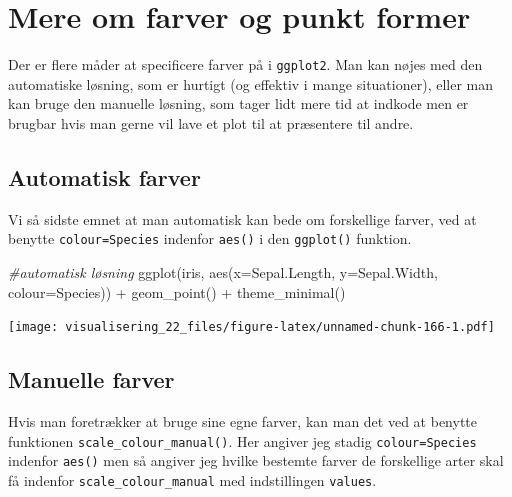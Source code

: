 \documentclass[
]{book}
\newenvironment{Shaded}{\begin{snugshade}}{\end{snugshade}}
\newcommand{\AttributeTok}[1]{\textcolor[rgb]{0.77,0.63,0.00}{#1}}
\newcommand{\CommentTok}[1]{\textcolor[rgb]{0.56,0.35,0.01}{\textit{#1}}}
\newcommand{\FunctionTok}[1]{\textcolor[rgb]{0.00,0.00,0.00}{#1}}
\newcommand{\NormalTok}[1]{#1}
\newcommand{\SpecialCharTok}[1]{\textcolor[rgb]{0.00,0.00,0.00}{#1}}
\begin{document}
\hypertarget{mere-om-farver-og-punkt-former}{%
\section{Mere om farver og punkt former}\label{mere-om-farver-og-punkt-former}}

Der er flere måder at specificere farver på i \texttt{ggplot2}. Man kan nøjes med den automatiske løsning, som er hurtigt (og effektiv i mange situationer), eller man kan bruge den manuelle løsning, som tager lidt mere tid at indkode men er brugbar hvis man gerne vil lave et plot til at præsentere til andre.

\hypertarget{automatisk-farver}{%
\subsection{Automatisk farver}\label{automatisk-farver}}

Vi så sidste emnet at man automatisk kan bede om forskellige farver, ved at benytte \texttt{colour=Species} indenfor \texttt{aes()} i den \texttt{ggplot()} funktion.

\begin{Shaded}
\begin{Highlighting}[]
\CommentTok{\#automatisk løsning}
\FunctionTok{ggplot}\NormalTok{(iris, }\FunctionTok{aes}\NormalTok{(}\AttributeTok{x=}\NormalTok{Sepal.Length, }\AttributeTok{y=}\NormalTok{Sepal.Width, }\AttributeTok{colour=}\NormalTok{Species)) }\SpecialCharTok{+}
  \FunctionTok{geom\_point}\NormalTok{() }\SpecialCharTok{+}
  \FunctionTok{theme\_minimal}\NormalTok{() }
\end{Highlighting}
\end{Shaded}

\texttt{[image: visualisering\_22\_files/figure-latex/unnamed-chunk-166-1.pdf]}

\hypertarget{manuelle-farver}{%
\subsection{Manuelle farver}\label{manuelle-farver}}

Hvis man foretrækker at bruge sine egne farver, kan man det ved at benytte funktionen \texttt{scale\_colour\_manual()}. Her angiver jeg stadig \texttt{colour=Species} indenfor \texttt{aes()} men så angiver jeg hvilke bestemte farver de forskellige arter skal få indenfor \texttt{scale\_colour\_manual} med indstillingen \texttt{values}.
\end{document}
